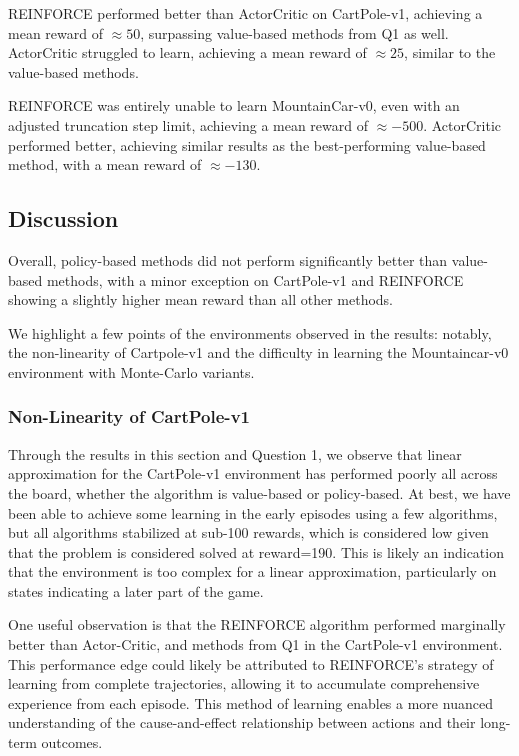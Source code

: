 \documentclass{article}
\begin{document}
REINFORCE performed better than ActorCritic on CartPole-v1, achieving a mean reward of $\approx 50$, surpassing
value-based methods from Q1 as well. ActorCritic struggled to learn, achieving a mean reward of $\approx 25$,
similar to the value-based methods.

REINFORCE was entirely unable to learn MountainCar-v0, even with an adjusted truncation step limit,
achieving a mean reward of $\approx -500$. ActorCritic performed better, achieving similar
results as the best-performing value-based method, with a mean reward of $\approx -130$.

\subsection{Discussion}
Overall, policy-based methods did not perform significantly better than value-based methods,
with a minor exception on CartPole-v1 and REINFORCE showing a slightly higher mean reward than
all other methods.

We highlight a few points of the environments observed in the results: notably, the non-linearity of
Cartpole-v1 and the difficulty in learning the Mountaincar-v0 environment with Monte-Carlo variants.

\subsubsection{Non-Linearity of CartPole-v1}

Through the results in this section and Question 1, we observe that linear approximation
for the CartPole-v1 environment has performed poorly all across the board, whether the algorithm
is value-based or policy-based. At best, we have been
able to achieve some learning in the early episodes using a few algorithms, but all algorithms
stabilized at sub-100 rewards, which is considered low given that the problem is considered solved at reward=190\cite{gym}.
This is likely an indication that the environment is too complex for a linear
approximation, particularly on states indicating a later part of the game.

One useful observation is that the REINFORCE algorithm performed marginally better
than Actor-Critic, and methods from Q1 in the CartPole-v1 environment.
This performance edge could likely be attributed to REINFORCE's strategy of learning from complete trajectories,
allowing it to accumulate comprehensive experience from each episode.
This method of learning enables a more nuanced understanding of the cause-and-effect
relationship between actions and their long-term outcomes.
\end{document}
